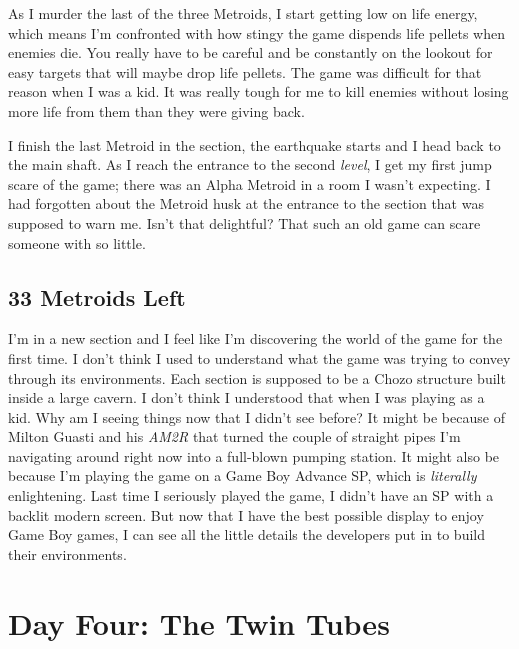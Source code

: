 \documentclass{book}
\begin{document}
As I murder the last of the three Metroids, I start getting low on life energy, which means I’m confronted with how stingy the game dispends life pellets when enemies die. You really have to be careful and be constantly on the lookout for easy targets that will maybe drop life pellets. The game was difficult for that reason when I was a kid. It was really tough for me to kill enemies without losing more life from them than they were giving back.

I finish the last Metroid in the section, the earthquake starts and I head back to the main shaft. As I reach the entrance to the second \emph{level}, I get my first jump scare of the game; there was an Alpha Metroid in a room I wasn’t expecting. I had forgotten about the Metroid husk at the entrance to the section that was supposed to warn me. Isn’t that delightful? That such an old game can scare someone with so little.

\subsection*{33 Metroids Left}\nopagebreak[4]

I’m in a new section and I feel like I’m discovering the world of the game for the first time. I don’t think I used to understand what the game was trying to convey through its environments. Each section is supposed to be a Chozo structure built inside a large cavern. I don’t think I understood that when I was playing as a kid. Why am I seeing things now that I didn’t see before? It might be because of Milton Guasti and his \emph{AM2R} that turned the couple of straight pipes I’m navigating around right now into a full-blown pumping station. It might also be because I’m playing the game on a Game Boy Advance SP, which is \emph{literally} enlightening. Last time I seriously played the game, I didn’t have an SP with a backlit modern screen. But now that I have the best possible display to enjoy Game Boy games, I can see all the little details the developers put in to build their environments.

\FloatBarrier\needspace{5pt}\section*{Day Four: The Twin Tubes}\nopagebreak[4]
\end{document}
